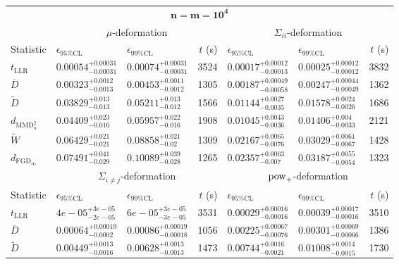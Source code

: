 \begin{tabular}{l|llr|llr}
	\toprule
	\multicolumn{7}{c}{$\mathbf{n=m=10^{4}}$} \\
	\multicolumn{1}{c}{} & \multicolumn{3}{c}{$\mu$-deformation} & \multicolumn{3}{c}{$\Sigma_{ii}$-deformation} \\
	Statistic & $\epsilon_{95\%\mathrm{CL}}$ & $\epsilon_{99\%\mathrm{CL}}$ & $t$ (s) & $\epsilon_{95\%\mathrm{CL}}$ & $\epsilon_{99\%\mathrm{CL}}$ & $t$ (s) \\
	\midrule
	$t_{\mathrm{LLR}}$ & $0.00054_{-0.00031}^{+0.00031}$ & $0.00074_{-0.00031}^{+0.00031}$ & 3524 & $0.00017_{-0.00013}^{+0.00012}$ & $0.00025_{-0.00012}^{+0.00012}$ & 3832 \\
	$\overline{D}$ & $0.00323_{-0.0013}^{+0.0012}$ & $0.00453_{-0.0012}^{+0.0011}$ & 1305 & $0.00187_{-0.00058}^{+0.00049}$ & $0.00247_{-0.00049}^{+0.00044}$ & 1362 \\
	$\widetilde{D}$ & $0.03829_{-0.013}^{+0.013}$ & $0.05211_{-0.012}^{+0.013}$ & 1566 & $0.01144_{-0.0035}^{+0.0027}$ & $0.01578_{-0.0026}^{+0.0024}$ & 1686 \\
	$d_{\mathrm{MMD}^{2}_{u}}$ & $0.04409_{-0.016}^{+0.023}$ & $0.05957_{-0.016}^{+0.022}$ & 1908 & $0.01045_{-0.0036}^{+0.0043}$ & $0.01406_{-0.0033}^{+0.004}$ & 2121 \\
	$\widetilde{W}$ & $0.06429_{-0.021}^{+0.021}$ & $0.08858_{-0.02}^{+0.021}$ & 1309 & $0.02167_{-0.0076}^{+0.0065}$ & $0.03029_{-0.0067}^{+0.0061}$ & 1428 \\
	$d_{\mathrm{FGD}_{\infty}}$ & $0.07491_{-0.029}^{+0.041}$ & $0.10089_{-0.028}^{+0.039}$ & 1265 & $0.02357_{-0.007}^{+0.0063}$ & $0.03187_{-0.0054}^{+0.0055}$ & 1323 \\
	\toprule
	\multicolumn{1}{c}{} & \multicolumn{3}{c}{$\Sigma_{i\neq j}$-deformation} & \multicolumn{3}{c}{$\rm{pow}_{+}$-deformation} \\
	Statistic & $\epsilon_{95\%\mathrm{CL}}$ & $\epsilon_{99\%\mathrm{CL}}$ & $t$ (s) & $\epsilon_{95\%\mathrm{CL}}$ & $\epsilon_{99\%\mathrm{CL}}$ & $t$ (s) \\
	\midrule
	$t_{\mathrm{LLR}}$ & $4e-05_{-2e-05}^{+3e-05}$ & $6e-05_{-3e-05}^{+3e-05}$ & 3531 & $0.00029_{-0.00016}^{+0.00016}$ & $0.00039_{-0.00016}^{+0.00017}$ & 3510 \\
	$\overline{D}$ & $0.00064_{-0.0002}^{+0.00019}$ & $0.00086_{-0.00018}^{+0.00019}$ & 1056 & $0.00225_{-0.00076}^{+0.00067}$ & $0.00301_{-0.00066}^{+0.00069}$ & 1386 \\
	$\widetilde{D}$ & $0.00449_{-0.0016}^{+0.0013}$ & $0.00628_{-0.0013}^{+0.0013}$ & 1473 & $0.00744_{-0.0021}^{+0.0016}$ & $0.01008_{-0.0015}^{+0.0014}$ & 1730 \\

\end{tabular}
